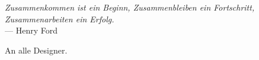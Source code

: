 \thispagestyle{empty}
{}

\vspace*{9cm}

\begin{center}
	\emph{Zusammenkommen ist ein Beginn,
	Zusammenbleiben ein Fortschritt, 
	Zusammenarbeiten ein Erfolg.} \\ \medskip
    --- Henry Ford    
\end{center}

\medskip

\begin{center}
    An alle Designer. \\ \smallskip
\end{center}